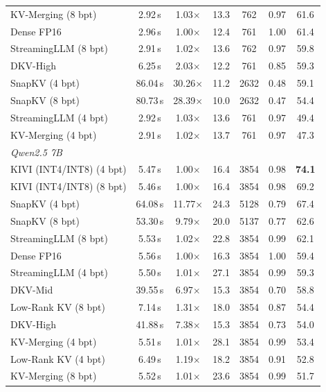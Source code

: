 \begin{tabular}{l cc cc cc}
KV-Merging (8 bpt) & 2.92\,s & 1.03$\times$ & 13.3 & 762 & 0.97 & 61.6 \\
Dense FP16 & 2.96\,s & 1.00$\times$ & 12.4 & 761 & 1.00 & 61.4 \\
StreamingLLM (8 bpt) & 2.91\,s & 1.02$\times$ & 13.6 & 762 & 0.97 & 59.8 \\
DKV-High & 6.25\,s & 2.03$\times$ & 12.2 & 761 & 0.85 & 59.3 \\
SnapKV (4 bpt) & 86.04\,s & 30.26$\times$ & 11.2 & 2632 & 0.48 & 59.1 \\
SnapKV (8 bpt) & 80.73\,s & 28.39$\times$ & 10.0 & 2632 & 0.47 & 54.4 \\
StreamingLLM (4 bpt) & 2.92\,s & 1.03$\times$ & 13.6 & 761 & 0.97 & 49.4 \\
KV-Merging (4 bpt) & 2.91\,s & 1.02$\times$ & 13.7 & 761 & 0.97 & 47.3 \\
\midrule
\multicolumn{7}{l}{\textit{Qwen2.5 7B}} \\
\midrule
KIVI (INT4/INT8) (4 bpt) & 5.47\,s & 1.00$\times$ & 16.4 & 3854 & 0.98 & \textbf{74.1} \\
KIVI (INT4/INT8) (8 bpt) & 5.46\,s & 1.00$\times$ & 16.4 & 3854 & 0.98 & 69.2 \\
SnapKV (4 bpt) & 64.08\,s & 11.77$\times$ & 24.3 & 5128 & 0.79 & 67.4 \\
SnapKV (8 bpt) & 53.30\,s & 9.79$\times$ & 20.0 & 5137 & 0.77 & 62.6 \\
StreamingLLM (8 bpt) & 5.53\,s & 1.02$\times$ & 22.8 & 3854 & 0.99 & 62.1 \\
Dense FP16 & 5.56\,s & 1.00$\times$ & 16.3 & 3854 & 1.00 & 59.4 \\
StreamingLLM (4 bpt) & 5.50\,s & 1.01$\times$ & 27.1 & 3854 & 0.99 & 59.3 \\
DKV-Mid & 39.55\,s & 6.97$\times$ & 15.3 & 3854 & 0.70 & 58.8 \\
Low-Rank KV (8 bpt) & 7.14\,s & 1.31$\times$ & 18.0 & 3854 & 0.87 & 54.4 \\
DKV-High & 41.88\,s & 7.38$\times$ & 15.3 & 3854 & 0.73 & 54.0 \\
KV-Merging (4 bpt) & 5.51\,s & 1.01$\times$ & 28.1 & 3854 & 0.99 & 53.4 \\
Low-Rank KV (4 bpt) & 6.49\,s & 1.19$\times$ & 18.2 & 3854 & 0.91 & 52.8 \\
KV-Merging (8 bpt) & 5.52\,s & 1.01$\times$ & 23.6 & 3854 & 0.99 & 51.7 \\
\bottomrule
\end{tabular}
